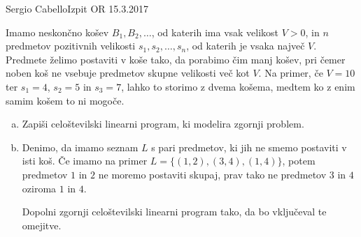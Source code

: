 \begin{naloga}{Sergio Cabello}{Izpit OR 15.3.2017}
\begin{vprasanje}
Imamo neskončno košev $B_1, B_2, \dots$,
od katerih ima vsak velikost $V > 0$,
in $n$ predmetov pozitivnih velikosti $s_1, s_2, \dots, s_n$,
od katerih je vsaka največ $V$.
Predmete želimo postaviti v koše tako, da porabimo čim manj košev,
pri čemer noben koš ne vsebuje predmetov skupne velikosti več kot $V$.
Na primer, če $V = 10$ ter $s_1 = 4$, $s_2 = 5$ in $s_3 = 7$,
lahko to storimo z dvema košema, medtem ko z enim samim košem to ni mogoče.

\begin{enumerate}[(a)]
\item Zapiši celoštevilski linearni program, ki modelira zgornji problem.

\item Denimo, da imamo seznam $L$ s pari predmetov,
ki jih ne smemo postaviti v isti koš.
Če imamo na primer $L = \{(1, 2), (3, 4), (1, 4)\}$,
potem predmetov $1$ in $2$ ne moremo postaviti skupaj,
prav tako ne predmetov $3$ in $4$ oziroma $1$ in $4$.

Dopolni zgornji celoštevilski linearni program tako,
da bo vključeval te ome\-jit\-ve.
\end{enumerate}
\end{vprasanje}
\begin{odgovor}
\end{odgovor}
\end{naloga}
